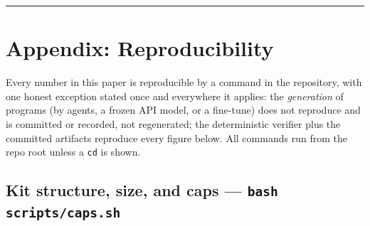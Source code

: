 \documentclass[11pt]{article}
\newcommand{\code}[1]{\texttt{#1}}
\begin{document}
\bigskip\hrule\bigskip

\section*{Appendix: Reproducibility}

Every number in this paper is reproducible by a command in the repository, with
one honest exception stated once and everywhere it applies: the \emph{generation} of
programs (by agents, a frozen API model, or a fine-tune) does not reproduce and
is committed or recorded, not regenerated; the deterministic verifier plus the
committed artifacts reproduce every figure below. All commands run from the repo
root unless a \code{cd} is shown.

\subsection*{Kit structure, size, and caps --- \code{bash scripts/caps.sh}}
\end{document}
